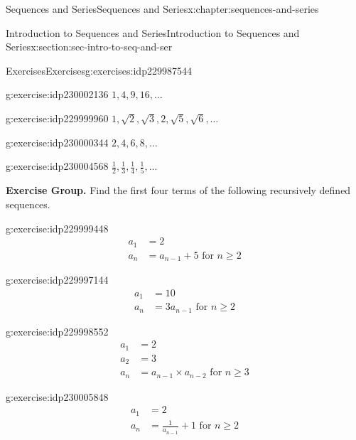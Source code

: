 \documentclass[twoside,10pt,]{book}
\numberwithin{equation}{section}
\newcommand{\amp}{&}
\begin{document}
\begin{chapterptx}{Sequences and Series}{}{Sequences and Series}{}{}{x:chapter:sequences-and-series}
\begin{sectionptx}{Introduction to Sequences and Series}{}{Introduction to Sequences and Series}{}{}{x:section:sec-intro-to-seq-and-ser}
\begin{exercises-subsection}{Exercises}{}{Exercises}{}{}{g:exercises:idp229987544}
\begin{exercisegroup}
\begin{divisionexerciseeg}{9}{}{}{g:exercise:idp230002136}
\(1, 4, 9, 16, \ldots\)\end{divisionexerciseeg}%
\begin{divisionexerciseeg}{10}{}{}{g:exercise:idp229999960}%
\(1,\sqrt 2 ,\sqrt 3 ,2,\sqrt 5 ,\sqrt 6 ,\ldots\)\end{divisionexerciseeg}%
\begin{divisionexerciseeg}{11}{}{}{g:exercise:idp230000344}%
\(2, 4, 6, 8, \ldots\)\end{divisionexerciseeg}%
\begin{divisionexerciseeg}{12}{}{}{g:exercise:idp230004568}%
\(\frac{1}{2},\frac{1}{3},\frac{1}{4},\frac{1}{5},...\)\end{divisionexerciseeg}%
\end{exercisegroup}
\par\medskip\noindent
\par\medskip\noindent%
\textbf{Exercise Group.}\space\space%
Find the first four terms of the following recursively defined sequences.\begin{exercisegroup}
\begin{divisionexerciseeg}{13}{}{}{g:exercise:idp229999448}%
%
\begin{align*}
a_1 \amp = 2\\
a_n \amp = a_{n - 1} + 5 \text{   for } n \ge 2
\end{align*}
\end{divisionexerciseeg}%
\begin{divisionexerciseeg}{14}{}{}{g:exercise:idp229997144}%
%
\begin{align*}
a_1 \amp = 10\\
a_n \amp = 3 a_{n - 1} \text{   for } n \ge 2
\end{align*}
\end{divisionexerciseeg}%
\begin{divisionexerciseeg}{15}{}{}{g:exercise:idp229998552}%
%
\begin{align*}
a_1 \amp = 2\\
a_2 \amp = 3\\
a_n \amp = a_{n - 1} \times a_{n - 2} \text{   for } n \ge 3
\end{align*}
\end{divisionexerciseeg}%
\begin{divisionexerciseeg}{16}{}{}{g:exercise:idp230005848}%
%
\begin{align*}
a_1 \amp = 2\\
a_n \amp =\frac{1}{a_{n - 1}} + 1 \text{   for } n \ge 2
\end{align*}

\end{divisionexerciseeg}
\end{exercisegroup}
\end{exercises-subsection}
\end{sectionptx}
\end{chapterptx}
\end{document}

